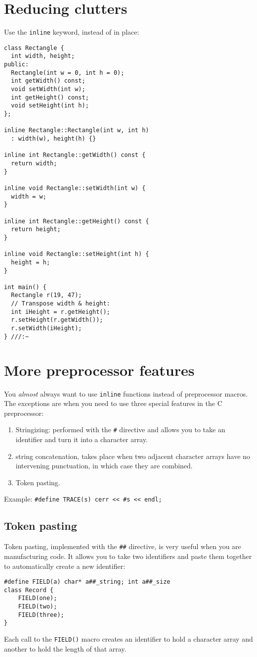 \documentclass[11pt, a4paper]{book}
\begin{document}
\section{Reducing clutters}
Use the \verb|inline| keyword, instead of in place:
\begin{verbatim}
class Rectangle {
  int width, height;
public:
  Rectangle(int w = 0, int h = 0);
  int getWidth() const;
  void setWidth(int w);
  int getHeight() const;
  void setHeight(int h);
};

inline Rectangle::Rectangle(int w, int h)
  : width(w), height(h) {}

inline int Rectangle::getWidth() const {
  return width;
}

inline void Rectangle::setWidth(int w) {
  width = w;
}

inline int Rectangle::getHeight() const {
  return height;
}

inline void Rectangle::setHeight(int h) {
  height = h;
}

int main() {
  Rectangle r(19, 47);
  // Transpose width & height:
  int iHeight = r.getHeight();
  r.setHeight(r.getWidth());
  r.setWidth(iHeight);
} ///:~
\end{verbatim}
\section{More preprocessor features}
You \emph{almost} always want to use \verb|inline| functions instead of
preprocessor macros. The exceptions are when you need to use three special
features in the C preprocessor:
\begin{enumerate}
\item Stringizing: performed with the \verb|#| directive and allows you to take
an identifier and turn it into a character array.
\item string concatenation, takes place when two adjacent character arrays have
no intervening punctuation, in which case they are combined.
\item Token pasting.
\end{enumerate}
Example: \verb|#define TRACE(s) cerr << #s << endl;|
\subsection{Token pasting}
Token pasting, implemented with the \verb|##| directive, is very useful when you
are manufacturing code. It allows you to take two identifiers and paste them
together to automatically create a new identifier:
\begin{verbatim}
#define FIELD(a) char* a##_string; int a##_size
class Record {
    FIELD(one);
    FIELD(two);
    FIELD(three);
}
\end{verbatim}
Each call to the \verb|FIELD()| macro creates an identifier to hold a character
array and another to hold the length of that array.
\end{document}
